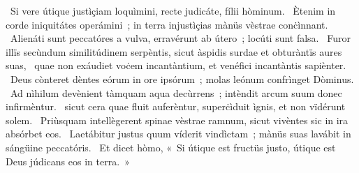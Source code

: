 ~Si vere útique justìçiam loquìmini, recte judicáte, fílii hòminum. 
~Ètenim in corde iniquitátes operámini~; in terra injustìçias mànüs vèstrae conċìnnant. 
~Alienáti sunt peccatóres a vulva, erravérunt ab útero~; locúti sunt falsa. 
~Furor illïs secùndum similitúdinem serpèntis, sicut àspidis surdae et obturàntïs aures suas, 
~quae non exáudiet voċem incantàntium, et venéfici incantàntis sapiènter. 
~Deus cònteret dèntes eórum in ore ipsórum~; molas leónum confrìnget Dòminus. 
~Ad nìhilum devènient tàmquam aqua decùrrens~; intèndit arcum suum donec infirmèntur. 
~sicut cera quae fluit auferèntur, superċìduit ìgnis, et non vïdérunt solem. 
~Priùsquam intellègerent spinae vèstrae ramnum, sicut vivèntes sic in ira absórbet eos. 
~Laetábitur justus quum víderit vindìctam~; mànüs suas lavábit in sángüine peccatóris. 
~Et dicet hòmo, «~Si útique est fructüs justo, útique est Deus júdicans eos in terra.~»
